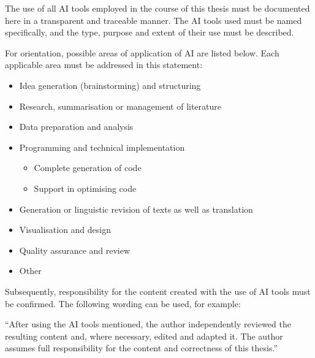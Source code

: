   The use of all AI tools employed in the course of this thesis must be documented here in a transparent and traceable manner. The AI tools used must be named specifically, and the type, purpose and extent of their use must be described.

  For orientation, possible areas of application of AI are listed below. Each applicable area must be addressed in this statement:
  \begin{itemize}
    \item Idea generation (brainstorming) and structuring
    \item Research, summarisation or management of literature
    \item Data preparation and analysis
    \item Programming and technical implementation
    \begin{itemize}
      \item Complete generation of code
      \item Support in optimising code
    \end{itemize}
    \item Generation or linguistic revision of texts as well as translation
    \item Visualisation and design
    \item Quality assurance and review
    \item Other
  \end{itemize}

  Subsequently, responsibility for the content created with the use of AI tools must be confirmed. The following wording can be used, for example:

  \enquote{After using the AI tools mentioned, the author independently reviewed the resulting content and, where necessary, edited and adapted it. The author assumes full responsibility for the content and correctness of this thesis.}
\fi